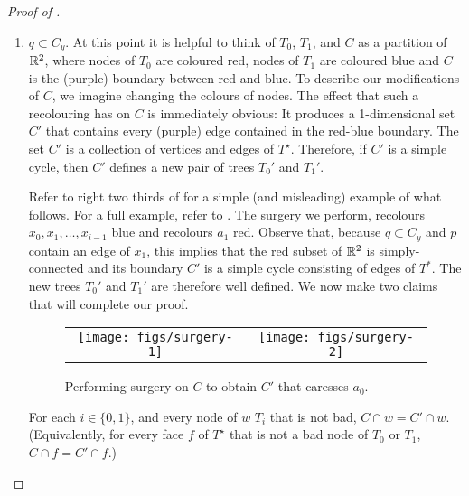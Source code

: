 \documentclass[a4paper,UKenglish]{socg-lipics-v2019}
\newcommand{\dual}[1]{{#1}^\star}
\begin{document}
\begin{proof}[Proof of ]
\begin{enumerate}
   \item $q\subset C_y$.  At this point it is helpful to think of
   $T_0$, $T_1$, and $C$ as a partition of $\mathbb{R}^2$, where nodes of $T_0$
   are coloured red, nodes of $T_1$ are coloured blue and $C$ is the
   (purple) boundary between red and blue.  To describe our modifications
   of $C$, we imagine changing the colours of nodes.  The effect that
   such a recolouring has on $C$ is immediately obvious: It produces a
   1-dimensional set $C'$ that contains every (purple) edge contained in
   the red-blue boundary. The set $C'$ is a collection of vertices and
   edges of $\dual{T}$. Therefore, if $C'$ is a simple cycle, then $C'$
   defines a new pair of trees $T_0'$ and $T_1'$.


   Refer to right two thirds of  for a simple
   (and misleading) example of what follows. For a full example,
   refer to .  The surgery we perform, recolours
   $x_0,x_1,\ldots,x_{i-1}$ blue and recolours $a_1$ red.  Observe that,
   because $q\subset C_y$ and $p$ contain an edge of $x_1$, this implies
   that the red subset of $\mathbb{R}^2$ is simply-connected and its boundary $C'$
   is a simple cycle consisting of edges of $T^*$.  The new trees $T_0'$
   and $T_1'$ are therefore well defined.  We now make two claims that
   will complete our proof.

   \begin{figure}
     \begin{center}
       \begin{tabular}{cc}
         \texttt{[image: figs/surgery-1]} &
         \texttt{[image: figs/surgery-2]} 
       \end{tabular}
     \end{center}
     \caption{Performing surgery on $C$ to obtain $C'$ that caresses $a_0$.}
   \end{figure}

   \begin{clm}
      For each $i\in\{0,1\}$, and every node of $w$ $T_i$ that is not bad,
      $C\cap w=C'\cap w$.  (Equivalently, for every face $f$ of $\dual{T}$
      that is not a bad node of $T_0$ or $T_1$, $C\cap f=C'\cap f$.)
   \end{clm}


\end{enumerate}
\end{proof}
\end{document}
